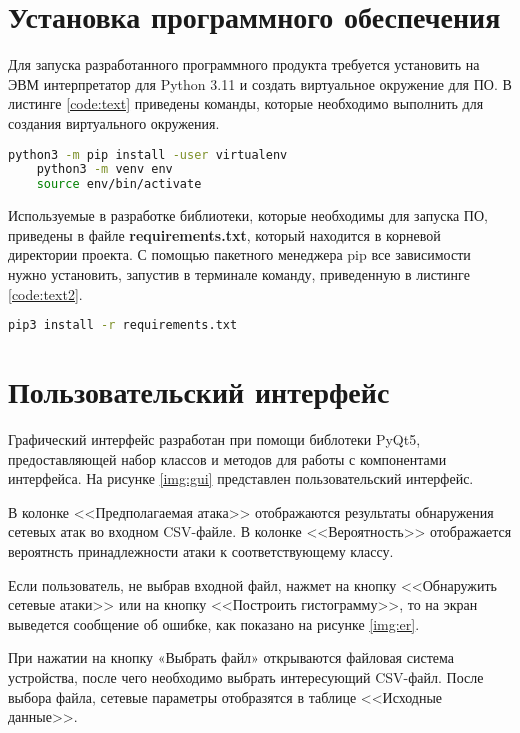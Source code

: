\section{Установка программного обеспечения}
Для запуска разработанного программного продукта требуется установить
на ЭВМ интерпретатор для Python 3.11 и создать виртуальное окружение для
ПО. В листинге \ref*{code:text} приведены команды, которые необходимо выполнить для
создания виртуального окружения.

\begin{lstlisting}[label=code:text, language=bash, caption={Команды для установки виртуального окружения}]
    python3 -m pip install -user virtualenv
    python3 -m venv env
    source env/bin/activate
\end{lstlisting}

Используемые в разработке библиотеки, которые необходимы для запуска
ПО, приведены в файле \textbf{requirements.txt}, который находится в корневой директории 
проекта. С помощью пакетного менеджера pip все зависимости нужно
установить, запустив в терминале команду, приведенную в
листинге \ref*{code:text2}.

\begin{lstlisting}[label=code:text2, language=bash, caption={Команда для установки необходимых библиотек}]
    pip3 install -r requirements.txt
\end{lstlisting}


\section{Пользовательский интерфейс}
Графический интерфейс разработан при помощи библотеки PyQt5, предоставляющей набор классов и методов для работы с компонентами интерфейса.
На рисунке \ref*{img:gui} представлен пользовательский интерфейс.

В колонке <<Предполагаемая атака>> отображаются результаты обнаружения сетевых атак во входном CSV-файле.
В колонке <<Вероятность>> отображается вероятнсть принадлежности атаки к соответствующему классу.

Если пользователь, не выбрав входной файл, нажмет на кнопку <<Обнаружить сетевые атаки>> или на кнопку <<Построить гистограмму>>,
то на экран выведется сообщение об ошибке, как показано на рисунке \ref*{img:er}.

При нажатии на кнопку «Выбрать файл» открываются файловая система
устройства, после чего необходимо выбрать интересующий CSV-файл.
После выбора файла, сетевые параметры отобразятся в таблице <<Исходные данные>>.

